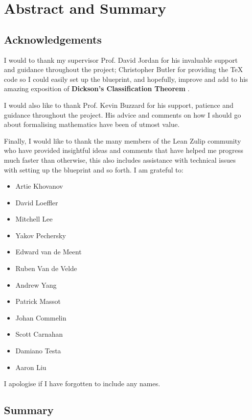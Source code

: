 \chapter{Abstract and Summary}\label{Ch1_AbstractAndAcknowledgements}

\section{Acknowledgements}

I would to thank my supervisor Prof. David Jordan for his invaluable support and guidance throughout the project;
Christopher Butler for providing the TeX code so I could easily set up the blueprint, and hopefully, improve and add to his amazing exposition of
\textbf{Dickson's Classification Theorem} \cite{butler}.

I would also like to thank Prof. Kevin Buzzard for his support, patience and guidance throughout the project. His advice and comments on how I should go about formalising mathematics have been of utmost value. 

Finally, I would like to thank the many members of the Lean Zulip community who have provided insightful ideas and comments that have helped me progress much faster than otherwise, 
this also includes assistance with technical issues with setting up the blueprint and so forth. I am grateful to:

\begin{itemize}
    \item Artie Khovanov
    \item David Loeffler
    \item Mitchell Lee
    \item Yakov Pechersky
    \item Edward van de Meent
    \item Ruben Van de Velde
    \item Andrew Yang
    \item Patrick Massot
    \item Johan Commelin
    \item Scott Carnahan
    \item Damiano Testa
    \item Aaron Liu
\end{itemize}

I apologise if I have forgotten to include any names.

\section{Summary}

